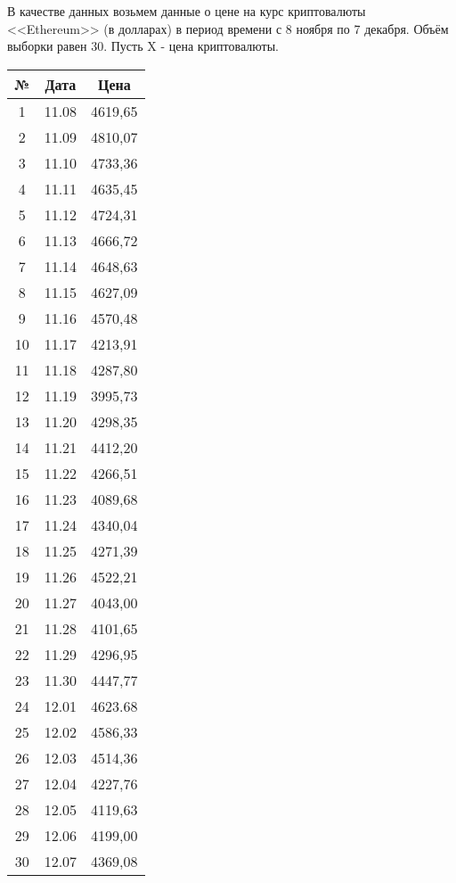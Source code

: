 \documentclass[utf8, a4paper, 14pt, russian, oneside]{book}
\begin{document}


\tableofcontents
\newpage


В качестве данных возьмем данные о цене на курс криптовалюты <<Ethereum>> (в долларах) в период времени с 8 ноября по 7 декабря. Объём выборки равен 30.
Пусть X - цена криптовалюты.
\begin{table}[h!]
    \centering
    \begin{tabular}{|c|c|c|}
        \hline
        № & Дата & Цена \\ \hline
        1 & 11.08 & 4619,65 \\ \hline
        2 & 11.09 & 4810,07 \\ \hline
        3 & 11.10 & 4733,36 \\ \hline
        4 & 11.11 & 4635,45 \\ \hline
        5 & 11.12 & 4724,31 \\ \hline
        6 & 11.13 & 4666,72 \\ \hline
        7 & 11.14 & 4648,63 \\ \hline
        8 & 11.15 & 4627,09 \\ \hline
        9 & 11.16 & 4570,48 \\ \hline
        10 & 11.17 & 4213,91 \\ \hline
        11 & 11.18 & 4287,80 \\ \hline
        12 & 11.19 & 3995,73 \\ \hline
        13 & 11.20 & 4298,35 \\ \hline
        14 & 11.21 & 4412,20 \\ \hline
        15 & 11.22 & 4266,51 \\ \hline
        16 & 11.23 & 4089,68 \\ \hline
        17 & 11.24 & 4340,04 \\ \hline
        18 & 11.25 & 4271,39 \\ \hline
        19 & 11.26 & 4522,21 \\ \hline
        20 & 11.27 & 4043,00 \\ \hline
        21 & 11.28 & 4101,65 \\ \hline
        22 & 11.29 & 4296,95 \\ \hline
        23 & 11.30 & 4447,77 \\ \hline
        24 & 12.01 & 4623.68 \\ \hline
        25 & 12.02 & 4586,33 \\ \hline
        26 & 12.03 & 4514,36 \\ \hline
        27 & 12.04 & 4227,76 \\ \hline
        28 & 12.05 & 4119,63 \\ \hline
        29 & 12.06 & 4199,00 \\ \hline
        30 & 12.07 & 4369,08 \\ \hline
    \end{tabular}
\end{table}
\end{document}

